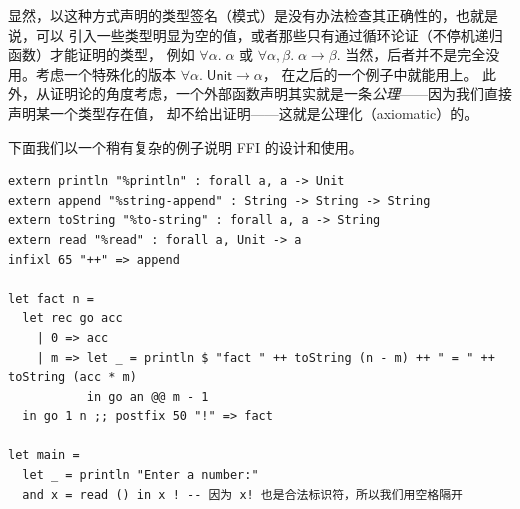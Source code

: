 \documentclass[a4paper, 11pt]{article}
\theoremstyle{remark}\newtheorem*{remark}{Remark}
\theoremstyle{definition}\newtheorem*{definition}{Definition}
\begin{document}
显然，以这种方式声明的类型签名（模式）是没有办法检查其正确性的，也就是说，可以
引入一些类型明显为空的值，或者那些只有通过循环论证（不停机递归函数）才能证明的类型，
例如 $\forall\alpha.\;\alpha$ 或 $\forall\alpha,\beta.\;\alpha\to\beta$.
当然，后者并不是完全没用。考虑一个特殊化的版本 $\forall\alpha.\;\mathsf{Unit}\to\alpha$，
在之后的一个例子中就能用上。
此外，从证明论的角度考虑，一个外部函数声明其实就是一条\emph{公理}——因为我们直接声明某一个类型存在值，
却不给出证明——这就是公理化（axiomatic）的。

下面我们以一个稍有复杂的例子说明 FFI 的设计和使用。

\begin{verbatim}
extern println "%println" : forall a, a -> Unit
extern append "%string-append" : String -> String -> String
extern toString "%to-string" : forall a, a -> String
extern read "%read" : forall a, Unit -> a
infixl 65 "++" => append

let fact n =
  let rec go acc
    | 0 => acc
    | m => let _ = println $ "fact " ++ toString (n - m) ++ " = " ++ toString (acc * m)
           in go an @@ m - 1
  in go 1 n ;; postfix 50 "!" => fact

let main =
  let _ = println "Enter a number:"
  and x = read () in x ! -- 因为 x! 也是合法标识符，所以我们用空格隔开
\end{verbatim}
\end{document}
